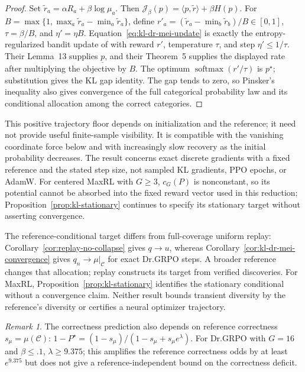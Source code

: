 \documentclass{article}
\newcommand{\enforcehalffinalproseline}{%
  \setlength{\parfillskip}{0pt plus .20\linewidth}}
\newcommand{\1}{\mathbf 1}
\theoremstyle{remark}
\newtheorem{remark}[lemma]{Remark}
\theoremstyle{definition}
\theoremstyle{plain}
\begin{document}
\begin{proof}
\enforcehalffinalproseline
Set $\widetilde r_a=\alpha R_a+\beta\log\mu_a$. Then
$\mathcal J_\beta(p)=\langle p,\widetilde r\rangle+\beta H(p)$.
For $B=\max\{1,\max_a\widetilde r_a-\min_a\widetilde r_a\}$, define
$r'_a=(\widetilde r_a-\min_b\widetilde r_b)/B\in[0,1]$,
$\tau=\beta/B$, and $\eta'=\eta B$. Equation~\eqref{eq:kl-dr-mei-update}
is exactly the entropy-regularized bandit update of
\citet{mei2020softmaxpg} with reward $r'$, temperature $\tau$, and step
$\eta'\le1/\tau$. Their Lemma~13 supplies $\underline p$, and their
Theorem~5 supplies the displayed rate after multiplying the objective by
$B$. The optimum $\operatorname{softmax}(r'/\tau)$ is $p^\star$;
substitution gives the KL gap identity. The gap tends to zero, so Pinsker's
inequality also gives convergence of the full categorical probability law
and its conditional allocation among the correct categories.
\end{proof}

This positive trajectory floor depends on initialization and the reference;
it need not provide useful finite-sample visibility. It is compatible with
the vanishing coordinate force below and with increasingly slow recovery
as the initial probability decreases. The result concerns exact discrete
gradients with a fixed reference and the stated step size, not sampled KL
gradients, PPO epochs, or AdamW. For centered MaxRL with $G\ge3$,
$c_G(P)$ is nonconstant, so its potential cannot be absorbed into the fixed
reward vector used in this reduction; Proposition~\ref{prop:kl-stationary}
continues to specify its stationary target without asserting convergence.


The reference-conditional target differs from full-coverage uniform replay:
Corollary~\ref{cor:replay-no-collapse} gives $q\to u$, whereas
Corollary~\ref{cor:kl-dr-mei-convergence} gives $q_n\to\mu|_{\mathcal C}$
for exact Dr.GRPO steps. A broader reference changes that allocation;
replay constructs its target from verified discoveries. For MaxRL,
Proposition~\ref{prop:kl-stationary} identifies the stationary conditional
without a convergence claim. Neither result bounds transient diversity by
the reference's diversity or certifies a neural optimizer trajectory.

\begin{remark}
The correctness prediction also depends on reference correctness
$s_\mu=\mu(\mathcal C)$:
$1-P^\star=(1-s_\mu)/(1-s_\mu+s_\mu e^\lambda)$.
For Dr.GRPO with $G=16$ and $\beta\le.1$, $\lambda\ge9.375$;
this amplifies the reference correctness odds by at least $e^{9.375}$ but
does not give a reference-independent bound on the correctness deficit.
\end{remark}
\end{document}
